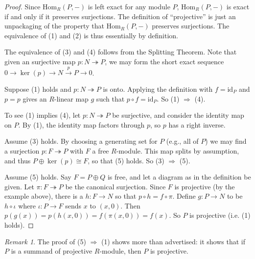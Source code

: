 \documentclass{amsart}[12pt]
\def\ker{\operatorname{ker}}
\newcommand{\Hom}{\mathrm{Hom}}
\newcommand{\onto}{\twoheadrightarrow}
\newcommand{\id}{\mathrm{id}}
\numberwithin{equation}{section}
\theoremstyle{plain} %
\theoremstyle{definition}
\theoremstyle{remark}
\newtheorem{rem}[equation]{Remark}
\newcommand{\xra}[1]{\xrightarrow{#1}}
\begin{document}
\begin{proof} 
Since $\Hom_R(P, -)$ is left exact for any module $P$, $\Hom_R(P,-)$ is exact if and only if it preserves surjections.
The definition of ``projective'' is just an unpackaging of the property that $\Hom_R(P, -)$ preserves surjections. 
The equivalence of (1) and (2) is thus essentially by definition. 

The equivalence of (3) and (4) follows from the Splitting Theorem. Note that given an surjective map $p: N \onto P$, we may form the short exact sequence $0 \to \ker(p) \to N \xra{p} P \to 0$.

Suppose (1) holds and  $p: N \onto P$ is onto. Applying the definition with $f = \id_P$ and $p = p$ gives an $R$-linear map $g$ 
such that $p \circ f = \id_P$.  So (1) $\Rightarrow$ (4).

To see (1) implies (4), let $p:N\onto P$ be surjective, and consider the identity map on $P$. By (1), the identity map factors through $p$, so $p$ has a right inverse.

Assume (3) holds. By choosing a generating set for $P$ (e.g., all of $P$) we may find a surjection $p: F \onto P$ with $F$ a free $R$-module.
This map splits by assumption, and thus  $P \oplus \ker(p) \cong F$, so that (5) holds. So (3) $\Rightarrow$ (5).

Assume (5) holds. Say $F = P \oplus Q$ is free, and let a diagram as in the definition be given. Let $\pi: F \onto P$ be the canonical surjection.
Since $F$ is projective (by the example above), there is a $h: F \to N$ so that $p \circ h = f \circ \pi$. 
Define $g: P \to N$ to be $h \circ \iota$ where $\iota: P \to F$ sends $x$ to $(x,0)$. Then
$p(g(x)) = p(h(x,0)) = f(\pi(x,0)) = f(x)$. So $P$ is projective (i.e. (1) holds). 
\end{proof}


\begin{rem} \label{rem1111}
  The proof of (5) $\Rightarrow$ (1) shows more than advertised: it shows that if $P$ is a summand of projective $R$-module, then $P$ is projective.
\end{rem}
\end{document}
